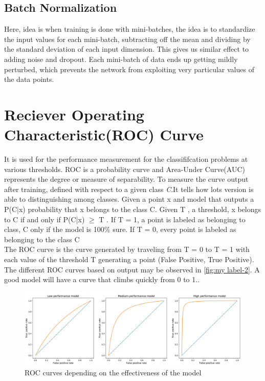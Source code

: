 \subsection{Batch Normalization}

Here, idea is when training is done with mini-batches, the idea is to standardize the input values for each mini-batch, subtracting off the mean and dividing by the standard deviation of each input dimension. This gives us similar effect to adding noise and dropout. Each mini-batch of data ends up getting mildly perturbed, which prevents the network from exploiting very particular values of the data points\cite{https://doi.org/10.48550/arxiv.1502.03167}.

\section{Reciever Operating Characteristic(ROC) Curve}
It is used for the performance measurement for the classififcation problems at various thresholds. ROC is a probability curve and Area-Under Curve(AUC) represents the degree or measure of separability\cite{BRADLEY19971145}. To measure the curve output after training, defined with respect to a given class \textit{C}.It tells how lots version is able to distinguishing among classes. Given a point x and model that outputs a P(C|x) probability that x belongs to the class C. Given T , a threshold, x belongs to C if and only if P(C|x) $\geq$ T . If T = 1, a point is labeled as belonging to class, C only if the model is 100\% sure. If T = 0, every point is labeled as belonging to the class C\\
The ROC curve is the curve generated by traveling from T = 0 to T = 1 with each value of the threshold T generating a point (False Positive, True Positive)\cite{Melo2013, Hajian-Tilaki2013}. The different ROC curves based on output may be observed in \autoref{fig:my label-2}. A good model will have a curve that climbs quickly from 0 to 1.. 
\begin{figure}[H]
    \centering
    \includegraphics[scale=0.3]{Figure/13__ml.png}
    \caption{ROC curves depending on the effectiveness of the model}
    \label{fig:my_label-2}
\end{figure}

